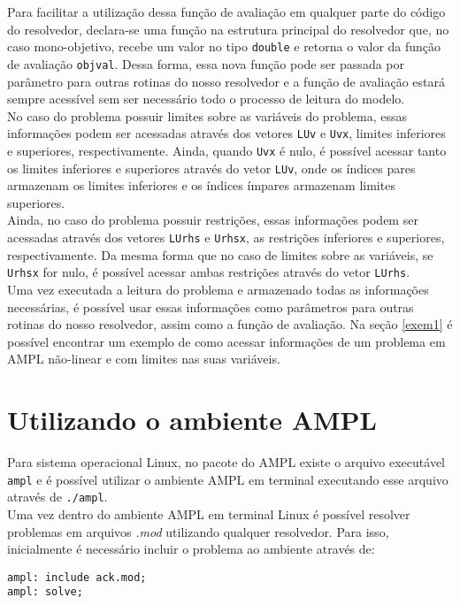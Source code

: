 \documentclass{article}
\begin{document}
Para facilitar a utilização dessa função de avaliação em qualquer parte do código do resolvedor, declara-se uma função na estrutura principal do resolvedor que, no caso mono-objetivo, recebe um valor no tipo \verb|double| e retorna o valor da função de avaliação \verb|objval|. Dessa forma, essa nova função pode ser passada por parâmetro para outras rotinas do nosso resolvedor e a função de avaliação estará sempre acessível sem ser necessário todo o processo de leitura do modelo.\\ 

No caso do problema possuir limites sobre as variáveis do problema, essas informações podem ser acessadas através dos vetores \verb|LUv| e \verb|Uvx|, limites inferiores e superiores, respectivamente. Ainda, quando \verb|Uvx| é nulo, é possível acessar tanto os limites inferiores e superiores através do vetor \verb|LUv|, onde os índices pares armazenam os limites inferiores e os índices ímpares armazenam limites superiores.\\

Ainda, no caso do problema possuir restrições, essas informações podem ser acessadas através dos vetores \verb|LUrhs| e \verb|Urhsx|, as restrições inferiores e superiores, respectivamente. Da mesma forma que no caso de limites sobre as variáveis, se \verb|Urhsx| for nulo, é possível acessar ambas restrições através do vetor \verb|LUrhs|.\\

Uma vez executada a leitura do problema e armazenado todas as informações necessárias, é possível usar essas informações como parâmetros para outras rotinas do nosso resolvedor, assim como a função de avaliação. Na seção \ref{exem1} é possível encontrar um exemplo de como acessar informações de um problema em AMPL não-linear e com limites nas suas variáveis.

\section{Utilizando o ambiente AMPL}
Para sistema operacional Linux, no pacote do AMPL existe o arquivo executável \verb|ampl| e é possível utilizar o ambiente AMPL em terminal executando esse arquivo através de \verb|./ampl|.\\

Uma vez dentro do ambiente AMPL em terminal Linux é possível resolver problemas em arquivos \textit{.mod} utilizando qualquer resolvedor. Para isso, inicialmente é necessário incluir o problema ao ambiente através de:
\begin{verbatim}
ampl: include ack.mod;
ampl: solve;
\end{verbatim}
\end{document}

